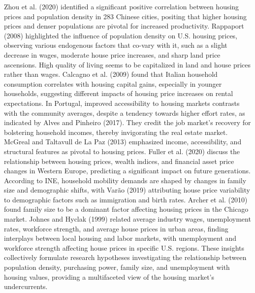 \documentclass{aip-cp}
\begin{document}
Zhou et al. (2020) identified a significant positive correlation between housing prices and population density in 283 Chinese cities, positing that higher housing prices and denser populations are pivotal for increased productivity.
Rappaport (2008) highlighted the influence of population density on U.S. housing prices, observing various endogenous factors that co-vary with it, such as a slight decrease in wages, moderate house price increases, and sharp land price ascensions. High quality of living seems to be capitalized in land and house prices rather than wages. Calcagno et al. (2009) found that Italian household consumption correlates with housing capital gains, especially in younger households, suggesting different impacts of housing price increases on rental expectations.
In Portugal, improved accessibility to housing markets contrasts with the community averages, despite a tendency towards higher effort rates, as indicated by Alves and Pinheiro (2017). They credit the job market's recovery for bolstering household incomes, thereby invigorating the real estate market. McGreal and Taltavull de La Paz (2013) emphasized income, accessibility, and structural features as pivotal to housing prices.
Fuller et al. (2020) discuss the relationship between housing prices, wealth indices, and financial asset price changes in Western Europe, predicting a significant impact on future generations. According to INE, household mobility demands are shaped by changes in family size and demographic shifts, with Varão (2019) attributing house price variability to demographic factors such as immigration and birth rates. Archer et al. (2010) found family size to be a dominant factor affecting housing prices in the Chicago market.
Johnes and Hyclak (1999) related average industry wages, unemployment rates, workforce strength, and average house prices in urban areas, finding interplays between local housing and labor markets, with unemployment and workforce strength affecting house prices in specific U.S. regions.
These insights collectively formulate research hypotheses investigating the relationship between population density, purchasing power, family size, and unemployment with housing values, providing a multifaceted view of the housing market's undercurrents.
\end{document}
